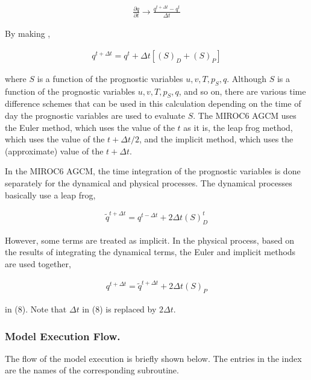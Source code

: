 \begin{eqnarray}
  \frac{\partial{q}}{\partial {t}} \rightarrow \frac{q^{t+\Delta t} - q^{t}}{\Delta t}
\end{eqnarray}

By making ,

\begin{eqnarray}
  q^{t+\Delta t} = q^{t}
       + \Delta t \left[ \left( S \right)_D + \left( S \right)_P  \right]
\end{eqnarray}

where \(S\) is a function of the prognostic variables \(u,v,T,p_S,q\).
Although \(S\) is a function of the prognostic variables
\(u,v,T,p_S,q\), and so on, there are various time difference schemes
that can be used in this calculation depending on the time of day the
prognostic variables are used to evaluate \(S\). The MIROC6 AGCM uses
the Euler method, which uses the value of the \(t\) as it is, the leap
frog method, which uses the value of the \(t+\Delta t/2\), and the
implicit method, which uses the (approximate) value of the
\(t+\Delta t\).

In the MIROC6 AGCM, the time integration of the prognostic variables is
done separately for the dynamical and physical processes. The dynamical
processes basically use a leap frog,

\begin{eqnarray}
  \tilde{q}^{t+\Delta t} = q^{t-\Delta t} + 2 \Delta t \left( S \right)_D^{t}
\end{eqnarray}

However, some terms are treated as implicit. In the physical process,
based on the results of integrating the dynamical terms, the Euler and
implicit methods are used together,

\begin{eqnarray}
  q^{t+\Delta t} = \tilde{q}^{t+\Delta t} + 2 \Delta t \left( S \right)_P
\end{eqnarray}

in (8). Note that \(\Delta t\) in (8) is replaced by \(2 \Delta t\).

\hypertarget{model-execution-flow.}{%
\subsubsection{Model Execution Flow.}\label{model-execution-flow.}}

The flow of the model execution is briefly shown below. The entries in
the index are the names of the corresponding subroutine.

